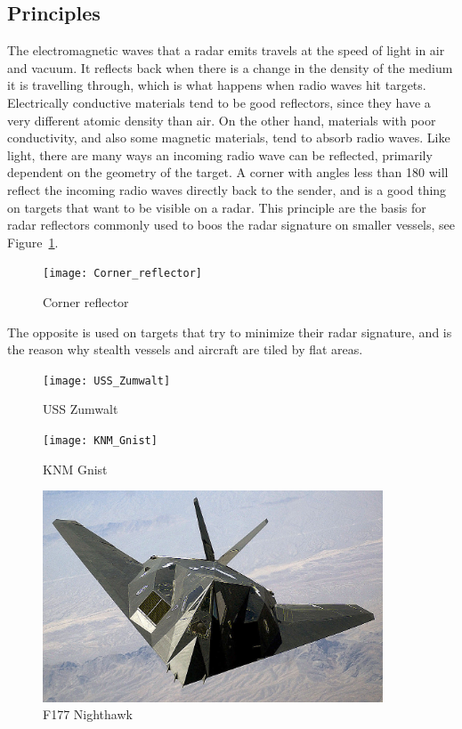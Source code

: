 \subsection{Principles}
The electromagnetic waves that a radar emits travels at the speed of light in air and vacuum. It reflects back when there is a change in the density of the medium it is travelling through, which is what happens when radio waves hit targets. Electrically conductive materials tend to be good reflectors, since they have a very different atomic density than air. On the other hand, materials with poor conductivity, and also some magnetic materials, tend to absorb radio waves. Like light, there are many ways an incoming radio wave can be reflected, primarily dependent on the geometry of the target. A corner with angles less than 180\degsym{} will reflect the incoming radio waves directly back to the sender, and is a good thing on targets that want to be visible on a radar. This principle are the basis for radar reflectors commonly used to boos the radar signature on smaller vessels, see Figure~\ref{fig:corner_reflector}.
\begin{figure}
\centering
\texttt{[image: Corner\_reflector]}
\caption{Corner reflector}\label{fig:corner_reflector}
\end{figure}
The opposite is used on targets that try to minimize their radar signature, and is the reason why stealth vessels and aircraft are tiled by flat areas. 
\begin{figure}
\centering
\begin{minipage}{0.3\textwidth}
\texttt{[image: USS\_Zumwalt]}
\caption{USS Zumwalt}\label{fig:uss_zumwalt}
\end{minipage}\hfill
\begin{minipage}{0.3\textwidth}
\texttt{[image: KNM\_Gnist]}
\caption{KNM Gnist}\label{fig:knm_gnist}
\end{minipage}\hfill
\begin{minipage}{0.3\textwidth}
\includegraphics[width=0.9\textwidth]{Figures/F-117_Nighthawk}
\caption{F177 Nighthawk}\label{fig:f177_nighthawk}
\end{minipage}
\end{figure}

